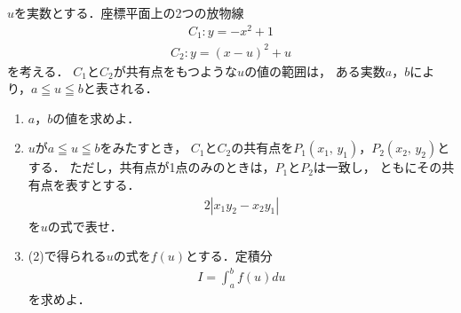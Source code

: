\documentclass[../../main.tex]{subfiles}
\begin{document}
$u$を実数とする．座標平面上の2つの放物線
\begin{align*}
  C_1:y=-x^2+1
\end{align*}
\begin{align*}
  C_2:y={(x-u)}^2+u
\end{align*}
を考える．
$C_1$と$C_2$が共有点をもつような$u$の値の範囲は，
ある実数$a$，$b$により，$a \leqq u \leqq b$と表される．
\begin{enumerate}
  \item $a$，$b$の値を求めよ．
  \item $u$が$a \leqq u \leqq b$をみたすとき，
    $C_1$と$C_2$の共有点を$P_1(x_1, \, y_1)$，$P_2(x_2, \, y_2)$とする．
    ただし，共有点が1点のみのときは，$P_1$と$P_2$は一致し，
    ともにその共有点を表すとする．
    \begin{align*}
      2|x_1y_2-x_2y_1|
    \end{align*}
    を$u$の式で表せ．
  \item (2)で得られる$u$の式を$f(u)$とする．定積分
    \begin{align*}
      I=\int_a^bf(u)du
    \end{align*}
    を求めよ．
\end{enumerate}
\end{document}
